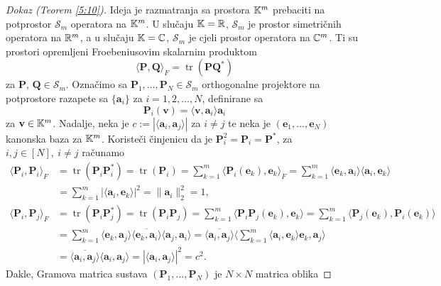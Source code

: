 \documentclass[a4paper,twoside,12pt]{memoir} %
\newcommand{\vect}[1]{\mathbf{#1}}
\renewcommand{\vec}{\vect}
\newcommand{\norm}[1]{\|{#1}\|}
\DeclareMathOperator{\tr}{tr}
\begin{document}
\begin{proof}[Dokaz (Teorem \ref{5:10})]
    Ideja je razmatranja sa prostora $\mathbb{K}^m$ prebaciti na potprostor $\mathcal{S}_m$ operatora na $\mathbb{K}^m$. U slu\v{c}aju $\mathbb{K} = \mathbb{R}$, $\mathcal{S}_m$ je prostor simetri\v{c}nih operatora na $\mathbb{R}^m$, a u slu\v{c}aju $\mathbb{K} = \mathbb{C}$, $\mathcal{S}_m$ je cjeli prostor operatora na $\mathbb{C}^m$. Ti su prostori opremljeni Froebeniusovim skalarnim produktom
    \begin{equation}
        \langle \vec P, \vec Q \rangle_F = \tr(\vec{PQ}^*) 
    \end{equation}
    za $\vec P$, $\vec Q \in \mathcal{S}_m$.
    Ozna\v{c}imo sa $\vec P_1, \dots, \vec P_N \in \mathcal{S}_m$ orthogonalne projektore na potprostore razapete sa $\{\vec a_i\}$ za $i=1,2,\dots,N$, definirane sa
    \begin{equation*}
        \vec P_i(\vec v) = \langle \vec v, \vec a_i \rangle \vec a_i
    \end{equation*}
    za $\vec v \in \K^m$. Nadalje, neka je $c:=|\langle \vec a_i, \vec a_j \rangle|$ za $i \neq j$ te neka je $(\vec e_1, \dots, \vec e_N)$ kanonska baza za $\mathbb{K}^m$. Koriste\v{c}i \v{c}injenicu da je $\vec P_i^2 = \vec P_i = \vec P^*$, za $i,j \in [N],\ i \neq j$ ra\v{c}unamo
    \begin{align*}
        \langle \vec P_i, \vec P_i \rangle_F &= \tr(\vec P_i \vec P_i^*) = \tr(\vec P_i) = \sum_{k=1}^{m} \langle \vec P_i(\vec e_k), \vec e_k \rangle_F = \sum_{k=1}^{m} \langle \vec e_k, \vec a_i \rangle \langle \vec a_i, \vec e_k \rangle \\
    &= \sum_{k=1}^m |\langle \vec a_i, \vec e_k \rangle|^2 = \norm{\vec a_i}_2^2 = 1, \\
        \langle \vec P_i, \vec P_j \rangle_F &= \tr(\vec P_i \vec P_j^*) = \tr(\vec P_i \vec P_j) = \sum_{k=1}^m \langle \vec P_i \vec P_j (\vec e_k), \vec e_k \rangle = \sum_{k=1}^m \langle \vec P_j(\vec e_k), \vec P_i(\vec e_k) \rangle \\
        &= \sum_{k=1}^m \langle \vec e_k, \vec a_j \rangle \overline{\langle \vec e_k, \vec a_i \rangle}\langle \vec a_j, \vec a_i \rangle = \overline{\langle \vec a_i, \vec a_j \rangle} \big \langle \sum_{k=1}^m \langle \vec a_i, \vec e_k \rangle \vec e_k, \vec a_j  \big \rangle\\
        &= \overline{\langle \vec a_i, \vec a_j \rangle} \langle \vec a_i, \vec a_j \rangle = |\langle \vec a_i, \vec a_j \rangle|^2 = c^2.
    \end{align*}
    Dakle, Gramova matrica sustava $(\vec P_1, \dots, \vec P_N)$ je $N \times N$ matrica oblika

\end{proof}
\end{document}
